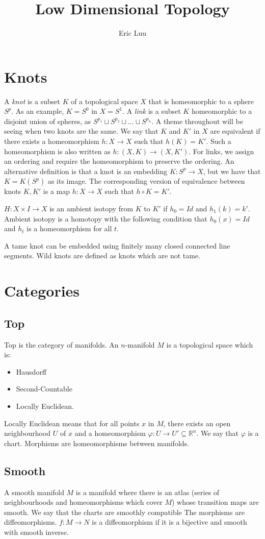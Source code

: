 \documentclass{article}
\title{Low Dimensional Topology}
\author{Eric Luu}
\theoremstyle{definition}
\numberwithin{theorem}{section}
\numberwithin{equation}{section}
\begin{document}
\section{Knots}
A \textit{knot} is a subset $K$ of a topological space $X$ that is homeomorphic to a sphere $S^p$. As an example, $K = S^0$ in $X = S^1$. A \textit{link} is a subset $K$ homeomorphic to a disjoint union of spheres, as $S^{p_1} \sqcup  S^{p_2} \sqcup \ldots \sqcup S^{p_n}$. A theme throughout will be seeing when two knots are the same. We say that $K$ and $K'$ in $X$ are equivalent if there exists a homeomorphism $h : X \rightarrow X$ such that $h(K) = K'$. 
Such a homeomorphism is also written as $h : (X, K) \rightarrow (X, K')$. For links, we assign an ordering and require the homeomorphism to preserve the ordering. 
An alternative definition is that a knot is an embedding $K: S^p \rightarrow X$, but we have that $K = K(S^p)$ as its image. The corresponding version of equivalence between knots $K, K'$ is a map $h: X \rightarrow X$ such that $h \circ K = K'$. 

$H : X \times I \rightarrow X$ is an ambient isotopy from $K$ to $K'$ if $h_0 = Id$ and $h_1(k) = k'$. Ambient isotopy is a homotopy with the following condition that $h_0(x) = Id$ and $h_t$ is a homeomorphism for all $t$. 

A tame knot can be embedded using finitely many closed connected line segments. Wild knots are defined as knots which are not tame. 

\section{Categories}
\subsection{Top}
Top is the category of manifolds. An $n$-manifold $M$ is a topological space which is:
\begin{itemize}
    \item Hausdorff
    \item Second-Countable
    \item Locally Euclidean.
\end{itemize}
Locally Euclidean means that for all points $x$ in $M$, there exists an open neighbourhood $U$ of $x$ and a homeomorphism $\varphi:U \rightarrow U' \subseteq \mathbb{R}^n$. We say that $\varphi$ is a chart. Morphisms are homeomorphisms between manifolds. 

\subsection{Smooth}
A smooth manifold $M$ is a manifold where there is an atlas (series of neighbourhoods and homeomorphisms which cover $M$) whose transition maps are smooth. We say that the charts are smoothly compatible The morphisms are diffeomorphisms. 
$f: M \rightarrow N$ is a diffeomorphism if it is a bijective and smooth with smooth inverse. 
\end{document}
